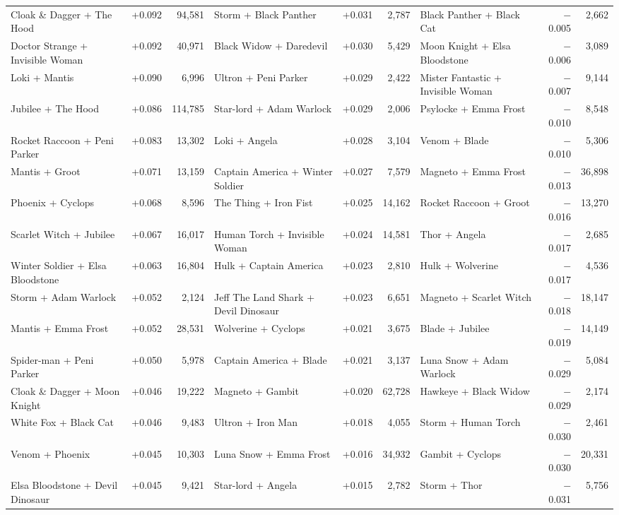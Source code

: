 \documentclass[11pt]{article}
\begin{document}
\begin{landscape}
\begin{center}
{\begin{tabular}{l r r @{\hspace{1em}} l r r @{\hspace{1em}} l r r}
Cloak \& Dagger + The Hood & +0.092 & 94,581 & Storm + Black Panther & +0.031 & 2,787 & Black Panther + Black Cat & $-$0.005 & 2,662 \\
Doctor Strange + Invisible Woman & +0.092 & 40,971 & Black Widow + Daredevil & +0.030 & 5,429 & Moon Knight + Elsa Bloodstone & $-$0.006 & 3,089 \\
Loki + Mantis & +0.090 & 6,996 & Ultron + Peni Parker & +0.029 & 2,422 & Mister Fantastic + Invisible Woman & $-$0.007 & 9,144 \\
Jubilee + The Hood & +0.086 & 114,785 & Star-lord + Adam Warlock & +0.029 & 2,006 & Psylocke + Emma Frost & $-$0.010 & 8,548 \\
Rocket Raccoon + Peni Parker & +0.083 & 13,302 & Loki + Angela & +0.028 & 3,104 & Venom + Blade & $-$0.010 & 5,306 \\
Mantis + Groot & +0.071 & 13,159 & Captain America + Winter Soldier & +0.027 & 7,579 & Magneto + Emma Frost & $-$0.013 & 36,898 \\
Phoenix + Cyclops & +0.068 & 8,596 & The Thing + Iron Fist & +0.025 & 14,162 & Rocket Raccoon + Groot & $-$0.016 & 13,270 \\
Scarlet Witch + Jubilee & +0.067 & 16,017 & Human Torch + Invisible Woman & +0.024 & 14,581 & Thor + Angela & $-$0.017 & 2,685 \\
Winter Soldier + Elsa Bloodstone & +0.063 & 16,804 & Hulk + Captain America & +0.023 & 2,810 & Hulk + Wolverine & $-$0.017 & 4,536 \\
Storm + Adam Warlock & +0.052 & 2,124 & Jeff The Land Shark + Devil Dinosaur & +0.023 & 6,651 & Magneto + Scarlet Witch & $-$0.018 & 18,147 \\
Mantis + Emma Frost & +0.052 & 28,531 & Wolverine + Cyclops & +0.021 & 3,675 & Blade + Jubilee & $-$0.019 & 14,149 \\
Spider-man + Peni Parker & +0.050 & 5,978 & Captain America + Blade & +0.021 & 3,137 & Luna Snow + Adam Warlock & $-$0.029 & 5,084 \\
Cloak \& Dagger + Moon Knight & +0.046 & 19,222 & Magneto + Gambit & +0.020 & 62,728 & Hawkeye + Black Widow & $-$0.029 & 2,174 \\
White Fox + Black Cat & +0.046 & 9,483 & Ultron + Iron Man & +0.018 & 4,055 & Storm + Human Torch & $-$0.030 & 2,461 \\
Venom + Phoenix & +0.045 & 10,303 & Luna Snow + Emma Frost & +0.016 & 34,932 & Gambit + Cyclops & $-$0.030 & 20,331 \\
Elsa Bloodstone + Devil Dinosaur & +0.045 & 9,421 & Star-lord + Angela & +0.015 & 2,782 & Storm + Thor & $-$0.031 & 5,756 \\

\end{tabular}}
\end{center}
\end{landscape}
\end{document}
